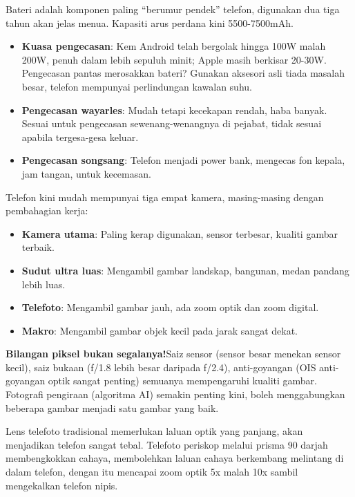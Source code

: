 
Bateri adalah komponen paling “berumur pendek” telefon, digunakan dua tiga tahun akan jelas menua. Kapasiti arus perdana kini 5500-7500mAh.

\begin{itemize}
  \item \textbf{Kuasa pengecasan}: Kem Android telah bergolak hingga 100W malah 200W, penuh dalam lebih sepuluh minit; Apple masih berkisar 20-30W. Pengecasan pantas merosakkan bateri? Gunakan aksesori asli tiada masalah besar, telefon mempunyai perlindungan kawalan suhu.
  \item \textbf{Pengecasan wayarles}: Mudah tetapi kecekapan rendah, haba banyak. Sesuai untuk pengecasan sewenang-wenangnya di pejabat, tidak sesuai apabila tergesa-gesa keluar.
  \item \textbf{Pengecasan songsang}: Telefon menjadi power bank, mengecas fon kepala, jam tangan, untuk kecemasan.
\end{itemize}


Telefon kini mudah mempunyai tiga empat kamera, masing-masing dengan pembahagian kerja:

\begin{itemize}
  \item \textbf{Kamera utama}: Paling kerap digunakan, sensor terbesar, kualiti gambar terbaik.
  \item \textbf{Sudut ultra luas}: Mengambil gambar landskap, bangunan, medan pandang lebih luas.
  \item \textbf{Telefoto}: Mengambil gambar jauh, ada zoom optik dan zoom digital.
  \item \textbf{Makro}: Mengambil gambar objek kecil pada jarak sangat dekat.
\end{itemize}

\textbf{Bilangan piksel bukan segalanya!}Saiz sensor (sensor besar menekan sensor kecil), saiz bukaan (f/1.8 lebih besar daripada f/2.4), anti-goyangan (OIS anti-goyangan optik sangat penting) semuanya mempengaruhi kualiti gambar. Fotografi pengiraan (algoritma AI) semakin penting kini, boleh menggabungkan beberapa gambar menjadi satu gambar yang baik.


Lens telefoto tradisional memerlukan laluan optik yang panjang, akan menjadikan telefon sangat tebal. Telefoto periskop melalui prisma 90 darjah membengkokkan cahaya, membolehkan laluan cahaya berkembang melintang di dalam telefon, dengan itu mencapai zoom optik 5x malah 10x sambil mengekalkan telefon nipis.


